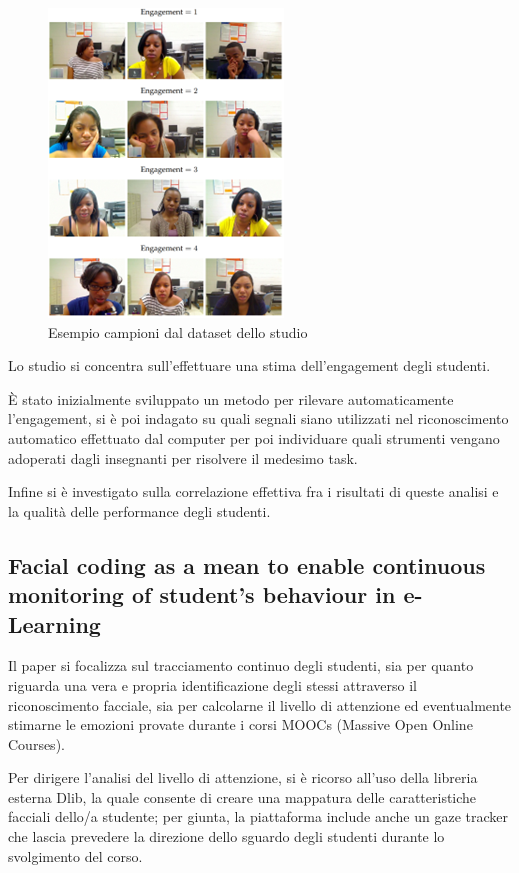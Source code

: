\begin{figure}
    \begin{center}    
        \includegraphics[width=0.4\linewidth]{images/2.png}
        \caption{Esempio campioni dal dataset dello studio}
    \end{center}
\end{figure}


Lo studio si concentra sull’effettuare una stima dell’engagement degli studenti. 

È stato inizialmente sviluppato un metodo per rilevare automaticamente l’engagement, si è poi indagato su quali segnali siano utilizzati nel riconoscimento automatico effettuato dal computer per poi individuare quali strumenti vengano adoperati dagli insegnanti per risolvere il medesimo task.

Infine si è investigato sulla correlazione effettiva fra i risultati di queste analisi e la qualità delle performance degli studenti.

\subsection{Facial coding as a mean to enable continuous monitoring of student’s behaviour in e-Learning }

Il paper \cite{FacialCodingContinMonitor} si focalizza sul tracciamento continuo degli studenti, sia per quanto riguarda una vera e propria identificazione degli stessi attraverso il riconoscimento facciale, sia per calcolarne il livello di attenzione ed eventualmente stimarne le emozioni provate durante i corsi MOOCs (Massive Open Online Courses).

Per dirigere l’analisi del livello di attenzione, si è ricorso all’uso della libreria esterna Dlib, la quale consente di creare una mappatura delle caratteristiche facciali dello/a studente; per giunta, la piattaforma include anche un gaze tracker che lascia prevedere la direzione dello sguardo degli studenti durante lo svolgimento del corso.

